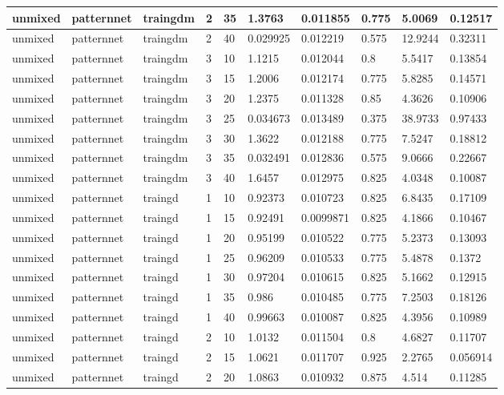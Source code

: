 \begin{longtable}{lllllllll}
unmixed & patternnet & traingdm & 2 & 35 & 1.3763 & 0.011855 & 0.775 & 5.0069 & 0.12517 \\ \hline 
unmixed & patternnet & traingdm & 2 & 40 & 0.029925 & 0.012219 & 0.575 & 12.9244 & 0.32311 \\ \hline 
unmixed & patternnet & traingdm & 3 & 10 & 1.1215 & 0.012044 & 0.8 & 5.5417 & 0.13854 \\ \hline 
unmixed & patternnet & traingdm & 3 & 15 & 1.2006 & 0.012174 & 0.775 & 5.8285 & 0.14571 \\ \hline 
unmixed & patternnet & traingdm & 3 & 20 & 1.2375 & 0.011328 & 0.85 & 4.3626 & 0.10906 \\ \hline 
unmixed & patternnet & traingdm & 3 & 25 & 0.034673 & 0.013489 & 0.375 & 38.9733 & 0.97433 \\ \hline 
unmixed & patternnet & traingdm & 3 & 30 & 1.3622 & 0.012188 & 0.775 & 7.5247 & 0.18812 \\ \hline 
unmixed & patternnet & traingdm & 3 & 35 & 0.032491 & 0.012836 & 0.575 & 9.0666 & 0.22667 \\ \hline 
unmixed & patternnet & traingdm & 3 & 40 & 1.6457 & 0.012975 & 0.825 & 4.0348 & 0.10087 \\ \hline 
unmixed & patternnet & traingd & 1 & 10 & 0.92373 & 0.010723 & 0.825 & 6.8435 & 0.17109 \\ \hline 
unmixed & patternnet & traingd & 1 & 15 & 0.92491 & 0.0099871 & 0.825 & 4.1866 & 0.10467 \\ \hline 
unmixed & patternnet & traingd & 1 & 20 & 0.95199 & 0.010522 & 0.775 & 5.2373 & 0.13093 \\ \hline 
unmixed & patternnet & traingd & 1 & 25 & 0.96209 & 0.010533 & 0.775 & 5.4878 & 0.1372 \\ \hline 
unmixed & patternnet & traingd & 1 & 30 & 0.97204 & 0.010615 & 0.825 & 5.1662 & 0.12915 \\ \hline 
unmixed & patternnet & traingd & 1 & 35 & 0.986 & 0.010485 & 0.775 & 7.2503 & 0.18126 \\ \hline 
unmixed & patternnet & traingd & 1 & 40 & 0.99663 & 0.010087 & 0.825 & 4.3956 & 0.10989 \\ \hline 
unmixed & patternnet & traingd & 2 & 10 & 1.0132 & 0.011504 & 0.8 & 4.6827 & 0.11707 \\ \hline 
unmixed & patternnet & traingd & 2 & 15 & 1.0621 & 0.011707 & 0.925 & 2.2765 & 0.056914 \\ \hline 
unmixed & patternnet & traingd & 2 & 20 & 1.0863 & 0.010932 & 0.875 & 4.514 & 0.11285 \\ \hline 

\end{longtable}
